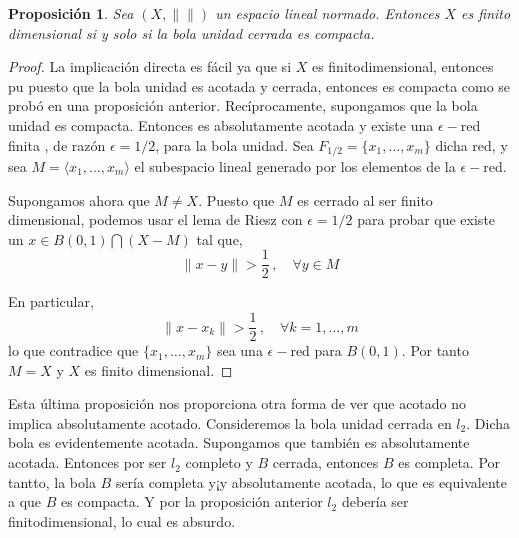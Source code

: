 \documentclass[12pt]{book}
\newtheorem{prop}{\bf Proposición}[chapter]
\newcommand{\norm}[1]{\lVert #1\rVert }
\begin{document}
\begin{prop} Sea $(X,\norm{})$ un espacio lineal normado. Entonces $X$ es finito dimensional  si y 
solo si la bola unidad cerrada es compacta.
\end{prop}
\begin{proof}
La implicación directa es fácil ya que si $X$ es finitodimensional, entonces pu puesto que la bola 
unidad es acotada y cerrada, entonces es compacta como se probó en una proposición anterior.
Recíprocamente, supongamos que  la bola unidad es compacta. Entonces es absolutamente 
acotada y existe una $\epsilon-$red  finita , de razón $\epsilon=1/2$, para la bola unidad. Sea 
$F_{1/2}=\{x_1,\dots,x_m\}$  dicha red,  y sea $M=\langle x_1,\dots, x_m\rangle$ el subespacio 
lineal generado por los elementos de la $\epsilon-$red.
 
Supongamos  ahora que $M\not= X$. Puesto que $M$ es cerrado al ser finito dimensional, 
podemos usar el lema de Riesz con  $\epsilon =1/2$ para probar que existe un $x\in B(0,1)\bigcap 
(X-M)$ tal  que,
$$\norm{x-y} >\frac{1}{2}\,,\quad \forall y\in M$$

En particular,
$$\norm{x-x_k}>\frac{1}{2}\,,\quad\forall k=1,\dots,m$$
lo que contradice que $\{x_1,\dots,x_m\}$ sea una $\epsilon-$red para $B(0,1)$. Por tanto $M=X$ y 
$X$ es finito dimensional. 
\end{proof}

Esta última proposición nos proporciona otra forma de ver que acotado no implica absolutamente 
acotado. Consideremos la bola unidad cerrada en $l_2$.  Dicha bola es evidentemente acotada. 
Supongamos que también es absolutamente acotada. Entonces por ser $l_2$ completo y $B$ 
cerrada, entonces $B$ es completa. Por tantto, la bola $B$ sería completa y¡y absolutamente 
acotada, lo que es equivalente a que $B$ es compacta. Y por la proposición anterior $l_2$ debería 
ser finitodimensional, lo cual es absurdo.
\end{document}
